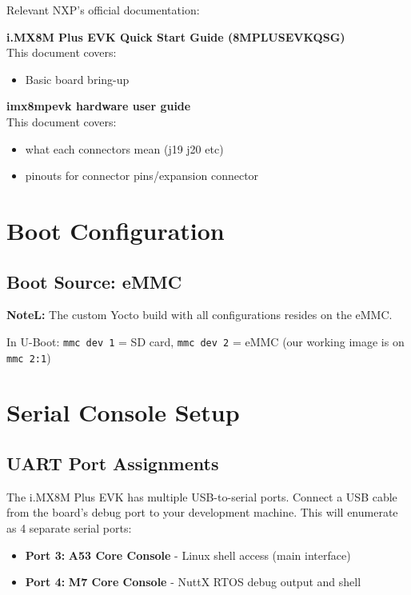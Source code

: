 \documentclass[12pt,a4paper]{report}
\begin{document}
\begin{docref}
Relevant NXP's official documentation:

\textbf{i.MX8M Plus EVK Quick Start Guide (8MPLUSEVKQSG)} \\
This document covers:
\begin{itemize}
    \item Basic board bring-up
\end{itemize}

\textbf{imx8mpevk hardware user guide} \\
This document covers:
\begin{itemize}
    \item what each connectors mean (j19 j20 etc)
    \item pinouts for connector pins/expansion connector
\end{itemize}

\end{docref}

\section{Boot Configuration}

\subsection{Boot Source: eMMC}

\begin{important}
\textbf{NoteL:} The custom Yocto build with all configurations resides on the eMMC.

In U-Boot: \texttt{mmc dev 1} = SD card, \texttt{mmc dev 2} = eMMC (our working image is on \texttt{mmc 2:1})
\end{important}


\section{Serial Console Setup}

\subsection{UART Port Assignments}

The i.MX8M Plus EVK has multiple USB-to-serial ports. Connect a USB cable from the board's debug port to your development machine. This will enumerate as 4 separate serial ports:

\begin{itemize}
    \item \textbf{Port 3:} \textbf{A53 Core Console} - Linux shell access (main interface)
    \item \textbf{Port 4:} \textbf{M7 Core Console} - NuttX RTOS debug output and shell
\end{itemize}
\end{document}

